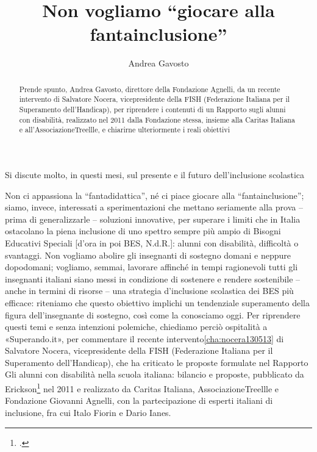 \author{Andrea Gavosto}
\title{Non vogliamo “giocare alla fantainclusione”}
\label{cha:gavosto270513}
\begin{abstract}
Prende spunto, Andrea Gavosto, direttore della Fondazione Agnelli, da un recente intervento di Salvatore Nocera, vicepresidente della FISH (Federazione Italiana per il Superamento dell’Handicap), per riprendere i contenuti di un Rapporto sugli alunni con disabilità, realizzato nel 2011 dalla Fondazione stessa, insieme alla Caritas Italiana e all’AssociazioneTreellle, e chiarirne ulteriormente i reali obiettivi
\end{abstract}
\maketitle
Si discute molto, in questi mesi, sul presente e il futuro dell'inclusione scolastica

Non ci appassiona la “fantadidattica”, né ci piace giocare alla “fantainclusione”; siamo, invece, interessati a sperimentazioni che mettano seriamente alla prova – prima di generalizzarle – soluzioni innovative, per superare i limiti che in Italia ostacolano la piena inclusione di uno spettro sempre più ampio di Bisogni Educativi Speciali [d'ora in poi BES, N.d.R.]: alunni con disabilità, difficoltà o svantaggi.
Non vogliamo abolire gli insegnanti di sostegno domani e neppure dopodomani; vogliamo, semmai, lavorare affinché in tempi ragionevoli tutti gli insegnanti italiani siano messi in condizione di sostenere e rendere sostenibile – anche in termini di risorse – una strategia d'inclusione scolastica dei BES più efficace: riteniamo che questo obiettivo implichi un tendenziale superamento della figura dell'insegnante di sostegno, così come la conosciamo oggi.
Per riprendere questi temi e senza intenzioni polemiche, chiediamo perciò ospitalità a «Superando.it», per commentare il recente intervento\ref{cha:nocera130513} di Salvatore Nocera, vicepresidente della FISH (Federazione Italiana per il Superamento dell'Handicap), che ha criticato le proposte formulate nel Rapporto Gli alunni con disabilità nella scuola italiana: bilancio e proposte, pubblicato da Erickson\footcite{treellle2011alunni} nel 2011 e realizzato da Caritas Italiana, AssociazioneTreellle e Fondazione Giovanni Agnelli, con la partecipazione di esperti italiani di inclusione, fra cui Italo Fiorin e Dario Ianes.


